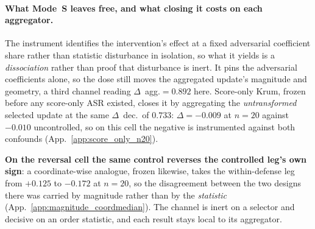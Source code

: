 \documentclass{article}
\begin{document}
\paragraph{What Mode~S leaves free, and what closing it costs on each aggregator.} The instrument identifies the intervention's effect at a fixed adversarial coefficient share rather than statistic disturbance in isolation, so what it yields is a \emph{dissociation} rather than proof that disturbance is inert. It pins the adversarial coefficients alone, so the dose still moves the aggregated update's magnitude and geometry, a third channel reading $\Delta$~agg.$={}0.892$ here. Score-only Krum, frozen before any score-only ASR existed, closes it by aggregating the \emph{untransformed} selected update at the same $\Delta$~dec.\ of $0.733$: $\Delta=-0.009$ at $n{=}20$ against $-0.010$ uncontrolled, so on this cell the negative is instrumented against both confounds (App.~\ref{app:score_only_n20}).

\noindent \textbf{On the reversal cell the same control reverses the controlled leg's own sign}: a coordinate-wise analogue, frozen likewise, takes the within-defense leg from $+0.125$ to $-0.172$ at $n{=}20$, so the disagreement between the two designs there was carried by magnitude rather than by the \emph{statistic} (App.~\ref{app:magnitude_coordmedian}). The channel is inert on a selector and decisive on an order statistic, and each result stays local to its aggregator.
\end{document}
